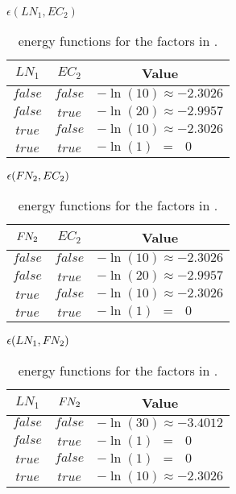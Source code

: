 \begin{table}[t]
\begin{minipage}{0.5\linewidth}
\centering
$\epsilon(LN_1,EC_2)$\par
\smallskip
\begin{tabular}{c c l}
 \toprule
 $LN_1$ & $EC_2$ & \multicolumn{1}{c}{Value} \\
 \midrule
 $\mathit{false}$ & $\mathit{false}$ & $-\ln(10)\approx-2.3026$ \\
 $\mathit{false}$ & $\mathit{true}$ & $-\ln(20)\approx-2.9957$ \\
 $\mathit{true}$ & $\mathit{false}$ & $-\ln(10)\approx-2.3026$ \\
 $\mathit{true}$ & $\mathit{true}$ & $-\ln(1)\ \ =\ \ \ 0$ \\
 \bottomrule
\end{tabular}
\end{minipage}
\hfill
\begin{minipage}{0.5\linewidth}
\centering
$\epsilon(F\hspace{-0.07em} N_2,EC_2)$\par
\smallskip
\begin{tabular}{c c l}
 \toprule
 $F\hspace{-0.07em} N_2$ & $EC_2$ & \multicolumn{1}{c}{Value} \\
 \midrule
 $\mathit{false}$ & $\mathit{false}$ & $-\ln(10)\approx-2.3026$ \\
 $\mathit{false}$ & $\mathit{true}$ & $-\ln(20)\approx-2.9957$ \\
 $\mathit{true}$ & $\mathit{false}$ & $-\ln(10)\approx-2.3026$ \\
 $\mathit{true}$ & $\mathit{true}$ & $-\ln(1)\ \ = \ \ \ 0$ \\
 \bottomrule
\end{tabular}
\end{minipage}
\medskip
\begin{center}
$\epsilon(LN_1,F\hspace{-0.07em} N_2)$\par
\smallskip
\begin{tabular}{c c l}
 \toprule
 $LN_1$ & $F\hspace{-0.07em} N_2$ & \multicolumn{1}{c}{Value} \\
 \midrule
 $\mathit{false}$ & $\mathit{false}$ & $-\ln(30)\approx-3.4012$ \\
 $\mathit{false}$ & $\mathit{true}$ & $-\ln(1)\ \ =\ \ \ 0$ \\
 $\mathit{true}$ & $\mathit{false}$ & $-\ln(1)\ \ =\ \ \ 0$ \\
 $\mathit{true}$ & $\mathit{true}$ & $-\ln(10)\approx-2.3026$ \\
 \bottomrule
\end{tabular}
\end{center}
\caption{\Glspl{energy function} for the \glspl{factor} in .}
\label{tab:example-energy-functions}
\end{table}

